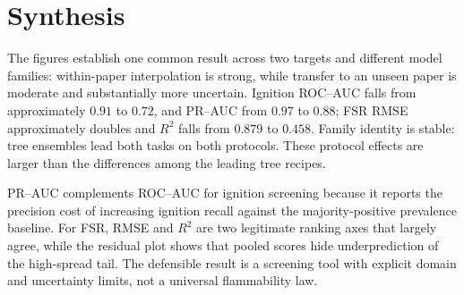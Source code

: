 \section{Synthesis}

The figures establish one common result across two targets and different model
families: within-paper interpolation is strong, while transfer to an unseen
paper is moderate and substantially more uncertain. Ignition ROC--AUC falls
from approximately \(0.91\) to \(0.72\), and PR--AUC from \(0.97\) to
\(0.88\); FSR RMSE approximately doubles and \(R^2\) falls from \(0.879\) to
\(0.458\). Family identity is stable: tree ensembles lead both tasks on both
protocols. These protocol effects are larger than the differences among the
leading tree recipes.

PR--AUC complements ROC--AUC for ignition screening because it reports the
precision cost of increasing ignition recall against the majority-positive
prevalence baseline. For FSR, RMSE and \(R^2\) are two
legitimate ranking axes that largely agree, while the residual plot shows
that pooled scores hide underprediction of the high-spread tail. The
defensible result is a screening tool with explicit domain and uncertainty
limits, not a universal flammability law.
